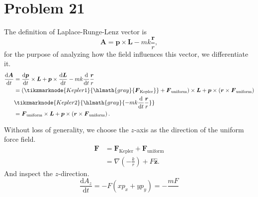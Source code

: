 \section*{Problem 21}

    The definition of Laplace-Runge-Lenz vector is
    \begin{equation}
        \boldsymbol{A} = \boldsymbol{p} \times \boldsymbol{L} -mk\frac{\boldsymbol{r}}{r},
    \end{equation}
    for the purpose of analyzing how the field influences this vector, we differentiate it.
    \begin{align}
        \frac{\mathrm{d}\boldsymbol{A}}{\mathrm{d}t} &= \frac{\mathrm{d}\boldsymbol{p}}{\mathrm{d}t}\times\boldsymbol{L} + \boldsymbol{p}\times\frac{\mathrm{d}\boldsymbol{L}}{\mathrm{d}t} - mk\frac{\mathrm{d}}{\mathrm{d}t}\frac{\boldsymbol{r}}{r}\nonumber
        \\
        & = \left( \tikzmarknode{Kepler1}{\hlmath{gray}{\boldsymbol{F}_{\text{Kepler}}}} + \boldsymbol{F}_{\text{uniform}} \right)\times\boldsymbol{L} + \boldsymbol{p}\times\left(\boldsymbol{r}\times\boldsymbol{F}_{\text{uniform}}\right)\nonumber
        \\
        &\tikzmarknode{Kepler2}{\hlmath{gray}{- mk\frac{\mathrm{d}}{\mathrm{d}t}\frac{\boldsymbol{r}}{r}}}\nonumber
        \\
        & = \boldsymbol{F}_{\text{uniform}}\times\boldsymbol{L} + \boldsymbol{p}\times\left(\boldsymbol{r}\times\boldsymbol{F}_{\text{uniform}}\right).
    \end{align}

    Without loss of generality, we choose the $z$-axis as the direction of the uniform force field.
    \begin{align}
        \boldsymbol{F} &= \boldsymbol{F}_{\text{Kepler}} + \boldsymbol{F}_{\text{uniform}}\nonumber
        \\
        & = \nabla(-\frac{k}{r}) + F\hat{\boldsymbol{z}}.
    \end{align}
    And inspect the $z$-direction.
    \begin{equation}
        \frac{\mathrm{d}A_z}{\mathrm{d}t} = -F\left(xp_x+yp_y\right)=-\frac{mF}{}
    \end{equation}